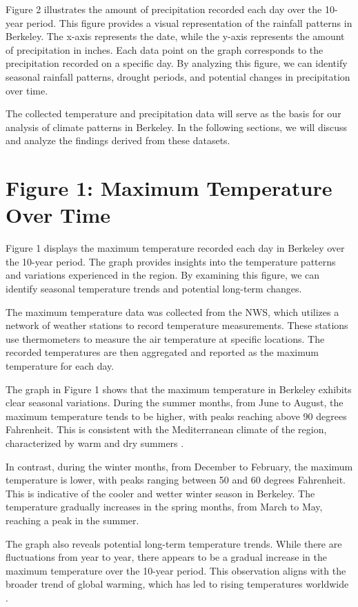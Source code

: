 \documentclass{article}
\begin{document}
Figure 2 illustrates the amount of precipitation recorded each day over the 10-year period. This figure provides a visual representation of the rainfall patterns in Berkeley. The x-axis represents the date, while the y-axis represents the amount of precipitation in inches. Each data point on the graph corresponds to the precipitation recorded on a specific day. By analyzing this figure, we can identify seasonal rainfall patterns, drought periods, and potential changes in precipitation over time.

The collected temperature and precipitation data will serve as the basis for our analysis of climate patterns in Berkeley. In the following sections, we will discuss and analyze the findings derived from these datasets.

\section{Figure 1: Maximum Temperature Over Time}

Figure 1 displays the maximum temperature recorded each day in Berkeley over the 10-year period. The graph provides insights into the temperature patterns and variations experienced in the region. By examining this figure, we can identify seasonal temperature trends and potential long-term changes.

The maximum temperature data was collected from the NWS, which utilizes a network of weather stations to record temperature measurements. These stations use thermometers to measure the air temperature at specific locations. The recorded temperatures are then aggregated and reported as the maximum temperature for each day.

The graph in Figure 1 shows that the maximum temperature in Berkeley exhibits clear seasonal variations. During the summer months, from June to August, the maximum temperature tends to be higher, with peaks reaching above 90 degrees Fahrenheit. This is consistent with the Mediterranean climate of the region, characterized by warm and dry summers \cite{NOAA}.

In contrast, during the winter months, from December to February, the maximum temperature is lower, with peaks ranging between 50 and 60 degrees Fahrenheit. This is indicative of the cooler and wetter winter season in Berkeley. The temperature gradually increases in the spring months, from March to May, reaching a peak in the summer.

The graph also reveals potential long-term temperature trends. While there are fluctuations from year to year, there appears to be a gradual increase in the maximum temperature over the 10-year period. This observation aligns with the broader trend of global warming, which has led to rising temperatures worldwide \cite{IPCC}.
\end{document}
